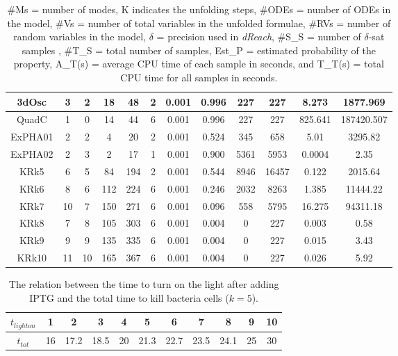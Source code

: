 \begin{center}
\begin{table*}[ht]
\begin{tabular}{c|c|c|c|c|c|c|c|c|c|c|c}
3dOsc & 3 & 2 & 18 & 48 & 2 & 0.001 & 0.996 & 227 & 227 & 8.273 & 1877.969 \\ \hline
QuadC & 1 & 0 & 14 & 44 & 6 & 0.001 & 0.996 & 227 & 227 & 825.641 & 187420.507 \\ \hline
ExPHA01 & 2 & 2 & 4 & 20 & 2 & 0.001 & 0.524 & 345 & 658 & 5.01 & 3295.82 \\ \hline
ExPHA02 &  2  &  3  & 2  & 17 & 1  &  0.001 &  0.900  & 5361 & 5953  & 0.0004   & 2.35  \\ \hline
KRk5 & 6   &  5  & 84  &194  & 2  &  0.001 &  0.544 & 8946   & 16457     &  0.122  & 2015.64  \\ \hline
KRk6 & 8   &  6  &112   &224  &  6 &  0.001 &  0.246  & 2032   & 8263     & 1.385   & 11444.22  \\ \hline
KRk7 & 10   &  7  & 150  &271  & 6  &  0.001 & 0.096 & 558   & 5795     & 16.275   & 94311.18  \\ \hline
KRk8 &  7  &  8  & 105  &303  & 6  &  0.001 &   0.004       &  0  & 227     & 0.003   & 0.58  \\ \hline
KRk9 &  9  &  9  & 135  & 335 & 6  &  0.001 &   0.004       & 0   & 227     & 0.015   &3.43   \\ \hline
KRk10 & 11   &  10  & 165  & 367 & 6  &  0.001 &  0.004        &0   &  227    & 0.026   &  5.92 \\ \hline
\end{tabular}
\caption {\#Ms = number of modes, K indicates the unfolding steps, \#ODEs = number of ODEs in the model, \#Vs = number of total variables in the unfolded formulae, \#RVs = number of random variables in the model, $\delta$ = precision used in {\it dReach}, \#S\_S = number of $\delta$-sat samples , \#T\_S = total number of samples, Est\_P = estimated probability of the property,  A\_T(s) = average CPU time of each sample in seconds, and T\_T(s) = total CPU time for all samples in seconds.}
\label{table:additonalexp}
\end{table*}
\end{center}

\begin{table*}[th!]
\captionsetup{font=scriptsize}
\centering
    \begin{tabular}{|c|c|c|c|c|c|c|c|c|c|c|}
    \hline
    $t_{lighton}$ & 1 & 2 & 3 & 4 & 5 & 6 & 7 & 8 & 9 & 10 \\ \hline
    $t_{tot}$ & 16  & 17.2     &  18.5   & 20   & 21.3 & 22.7 & 23.5 & 24.1 & 25 & 30    \\ \hline
    \end{tabular}
    \caption{The relation between the time to turn on the light after adding IPTG and the total time to kill bacteria cells ($k=5$). }
    \label{table:kr02}
\end{table*}

